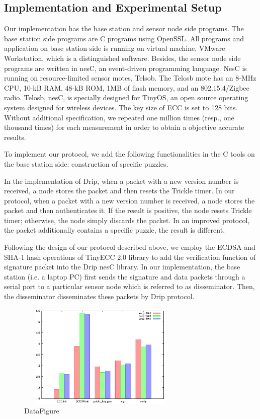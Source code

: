 \documentclass{sig-alternate-05-2015}
\begin{document}
\subsection{Implementation and Experimental Setup}
Our implementation has the base station and sensor node side programs. The base station side programs are C programs using OpenSSL. All programs and application on base station side is running on virtual machine, VMware Workstation, which is a distinguished software. Besides, the sensor node side programs are written in nesC, an event-driven programming language. NesC is running on resource-limited  sensor motes, Telsob. The Telosb mote has an 8-MHz CPU, 10-kB RAM, 48-kB ROM, 1MB of flash memory, and an 802.15.4/Zigbee radio. Telosb, nesC, is specially designed for TinyOS, an open source operating system designed for wireless devices. 
The key size of ECC is set to 128 bits.
Without additional specification,
we repeated one million times (resp., one thousand times) for each measurement in order to obtain a objective accurate results.

To implement our protocol, we add the following functionalities in the C tools on the base station side: construction of specific puzzles. 

In the implementation of Drip, when a packet with a new version number is received, a node stores the packet and then resets the Trickle timer. In our protocol, when a packet with a new version number is received, a node stores the packet and then authenticates it. If the result is positive, the node resets Trickle timer; otherwise, the node simply discards the packet. In  an improved protocol, the packet additionally contains a specific puzzle, the result is different.

Following the design of our protocol described above, we employ the ECDSA and SHA-1 hash operations of TinyECC 2.0 library to add the verification function of signature packet into the Drip nesC library. 
In our implementation, the base station (i.e. a laptop PC) first sends the signature and data packets through a serial port to a particular sensor node which is referred to as disseminator. Then, the disseminator disseminates these packets by Drip protocol.


\begin{figure}[ht]
\begin{center}
\includegraphics[width=8cm,height=5cm]{2.eps}
\end{center}
\caption{DataFigure}\label{fig:SSDArchitecture}
\end{figure}
\end{document}
